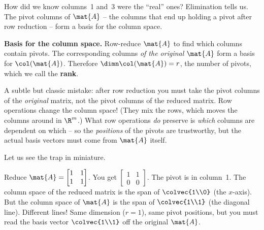 How did we know columns~1 and~3 were the ``real'' ones? Elimination tells us. The pivot columns
of $\mat{A}$ -- the columns that end up holding a pivot after row reduction -- form a basis for the
column space.

\begin{formalbox}
\textbf{Basis for the column space.} Row-reduce $\mat{A}$ to find which columns contain pivots.
The corresponding columns \emph{of the original $\mat{A}$} form a basis for $\col(\mat{A})$.
Therefore $\dimn \col(\mat{A}) = r$, the number of pivots, which we call the \textbf{rank}.
\end{formalbox}

\begin{trapbox}
A subtle but classic mistake: after row reduction you must take the pivot columns of the
\emph{original} matrix, not the pivot columns of the reduced matrix. Row operations change the
column space! (They mix the rows, which moves the columns around in $\R^m$.) What row operations
\emph{do} preserve is \emph{which} columns are dependent on which -- so the \emph{positions} of the
pivots are trustworthy, but the actual basis vectors must come from $\mat{A}$ itself.
\end{trapbox}

Let us see the trap in miniature.

\begin{labbox}
Reduce $\mat{A}=\begin{bmatrix}1&1\\1&1\end{bmatrix}$. You get
$\begin{bmatrix}1&1\\0&0\end{bmatrix}$. The pivot is in column~1. The column space of the reduced
matrix is the span of $\colvec{1\\0}$ (the $x$-axis). But the column space of $\mat{A}$ is the
span of $\colvec{1\\1}$ (the diagonal line). Different lines! Same dimension ($r=1$), same pivot
positions, but you must read the basis vector $\colvec{1\\1}$ off the original $\mat{A}$.
\end{labbox}


